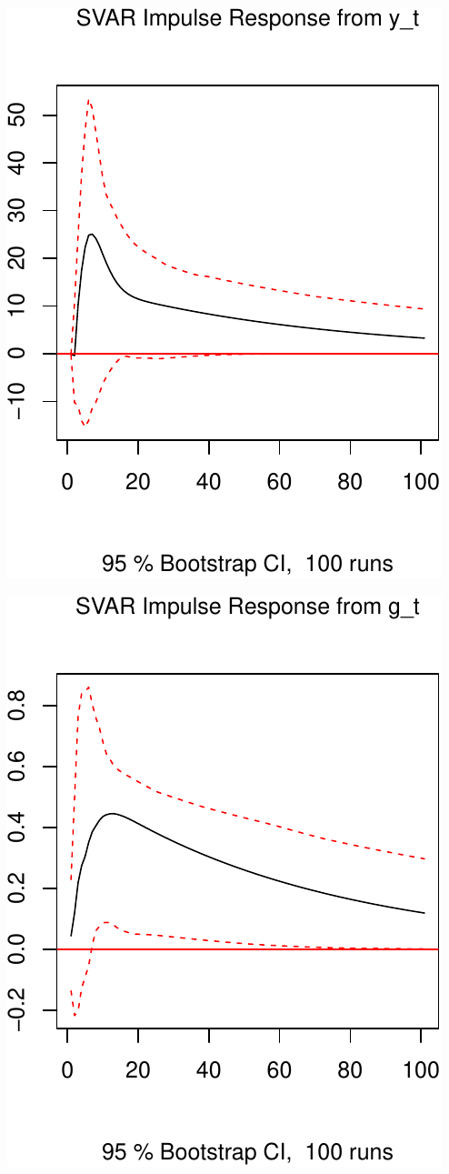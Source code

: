 \documentclass[11pt,preprint, authoryear]{elsarticle}
\numberwithin{equation}{section}
\numberwithin{figure}{section}
\numberwithin{table}{section}
\begin{document}
\includegraphics{TS_proj_files/figure-latex/unnamed-chunk-21-1.pdf}

\includegraphics{TS_proj_files/figure-latex/unnamed-chunk-22-1.pdf}
\end{document}
